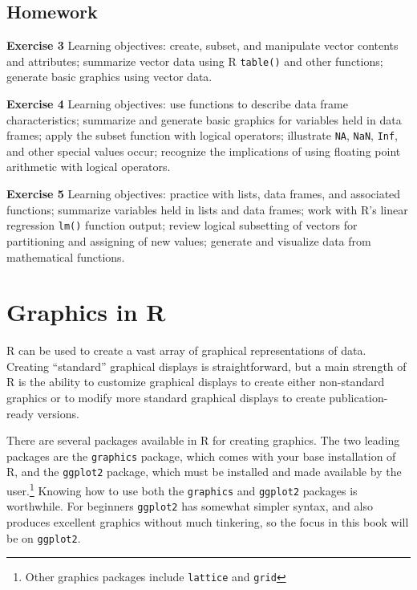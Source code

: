\documentclass[]{krantz}
\begin{document}
\hypertarget{homework-1}{%
\section{Homework}\label{homework-1}}

\textbf{Exercise 3} Learning objectives: create, subset, and manipulate vector contents and attributes; summarize vector data using R \texttt{table()} and other functions; generate basic graphics using vector data.

\textbf{Exercise 4} Learning objectives: use functions to describe data frame characteristics; summarize and generate basic graphics for variables held in data frames; apply the subset function with logical operators; illustrate \texttt{NA}, \texttt{NaN}, \texttt{Inf}, and other special values occur; recognize the implications of using floating point arithmetic with logical operators.

\textbf{Exercise 5} Learning objectives: practice with lists, data frames, and associated functions; summarize variables held in lists and data frames; work with R's linear regression \texttt{lm()} function output; review logical subsetting of vectors for partitioning and assigning of new values; generate and visualize data from mathematical functions.

\hypertarget{graphics-in-r}{%
\chapter{Graphics in R}\label{graphics-in-r}}

R can be used to create a vast array of graphical representations of data. Creating ``standard'' graphical displays is straightforward, but a main strength of R is the ability to customize graphical displays to create either non-standard graphics or to modify more standard graphical displays to create publication-ready versions.

There are several packages available in R for creating graphics. The two leading packages are the \texttt{graphics} package, which comes with your base installation of R, and the \texttt{ggplot2} package, which must be installed and made available by the user.\footnote{Other graphics packages include \texttt{lattice} and \texttt{grid}} Knowing how to use both the \texttt{graphics} and \texttt{ggplot2} packages is worthwhile. For beginners \texttt{ggplot2} has somewhat simpler syntax, and also produces excellent graphics without much tinkering, so the focus in this book will be on \texttt{ggplot2}.
\end{document}
